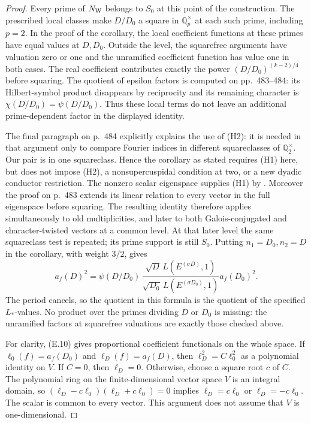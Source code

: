 \documentclass[11pt]{article}
\theoremstyle{definition}
\theoremstyle{remark}
\begin{document}
\begin{proof}
Every prime of $N_{\rm W}$ belongs to $S_0$ at this point of the
construction. The prescribed local classes make $D/D_0$ a square
in $\mathbb Q_p^\times$ at each such prime, including $p=2$.
In the proof of the corollary, the local coefficient functions
at these primes have equal values at $D,D_0$. Outside the level,
the squarefree arguments have valuation zero or one and the
unramified coefficient function has value one in both cases.
The real coefficient contributes exactly the power
$(D/D_0)^{(k-2)/4}$ before squaring. The quotient of epsilon
factors is computed on pp.~483--484: its Hilbert-symbol product
disappears by reciprocity and its remaining character is
$\chi(D/D_0)=\psi(D/D_0)$. Thus these local terms do not leave
an additional prime-dependent factor in the displayed identity.

The final paragraph on p.~484 explicitly explains the use of
(H2): it is needed in that argument only to compare Fourier
indices in different squareclasses of $\mathbb Q_2^\times$.
Our pair is in one squareclass. Hence the corollary as stated
requires (H1) here, but does not impose (H2), a nonsupercuspidal
condition at two, or a new dyadic conductor restriction. The
nonzero scalar eigenspace supplies (H1) by
\cite[Proposition~2, p.~377]{waldspurger}. Moreover the proof on
p.~483 extends its linear relation to every vector in the full
eigenspace before squaring. The resulting identity therefore
applies simultaneously to old multiplicities, and later to both
Galois-conjugated and character-twisted vectors at a common level.
At that later level the same squareclass test is repeated; its
prime support is still $S_0$.
Putting $n_1=D_0,n_2=D$ in the corollary, with weight $3/2$, gives
\[
 a_f(D)^2=
 \psi(D/D_0)\,
 \frac{\sqrt D\,L(E^{(\sigma D)},1)}
      {\sqrt{D_0}\,L(E^{(\sigma D_0)},1)}
 a_f(D_0)^2.                                      \tag{E.10}
\]
The period cancels, so the quotient in this formula is the quotient
of the specified $L_*$-values. No product over the primes dividing
$D$ or $D_0$ is missing: the unramified factors at squarefree
valuations are exactly those checked above.

For clarity, (E.10) gives proportional coefficient functionals on
the whole space. If $\ell_0(f)=a_f(D_0)$ and $\ell_D(f)=a_f(D)$,
then $\ell_D^2=C\ell_0^2$ as a polynomial identity on $V$.
If $C=0$, then $\ell_D=0$. Otherwise, choose a square root $c$ of
$C$. The polynomial ring on the finite-dimensional vector space
$V$ is an integral domain, so
$(\ell_D-c\ell_0)(\ell_D+c\ell_0)=0$ implies
$\ell_D=c\ell_0$ or $\ell_D=-c\ell_0$.
The scalar is common to every vector. This argument does not
assume that $V$ is one-dimensional.


\end{proof}
\end{document}
